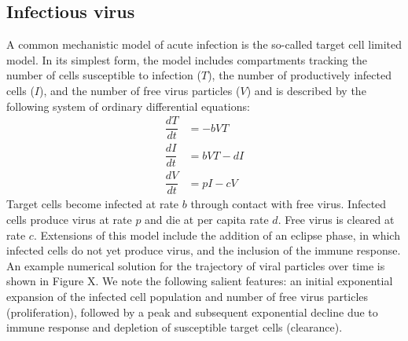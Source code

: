 \documentclass[11pt]{article}
\begin{document}
\subsection{Infectious virus}
A common mechanistic model of   acute infection is the so-called target cell limited model. In its simplest form, the model includes compartments tracking the number of cells susceptible to infection ($T$), the number of productively infected cells ($I$), and the number of free virus particles ($V$) and is described by the following system of ordinary differential equations:
\begin{align*}
    \dfrac{dT}{dt}&= -b V T \\
    \dfrac{dI}{dt}&= b V T - d I \\
    \dfrac{dV}{dt}&= p I - c V
\end{align*}
Target cells become infected at rate $b$ through contact with free virus. Infected cells produce virus at rate $p$ and die at per capita rate $d$. Free virus is cleared at rate $c$. Extensions of this model include the addition of an eclipse phase, in which infected cells do not yet produce virus, and the inclusion of the immune response. An example numerical solution for the trajectory of viral particles over time is shown in Figure X. We note the following salient features: an initial exponential expansion of the infected cell population and number of free virus particles (proliferation), followed by a peak and subsequent exponential decline due to immune response and depletion of susceptible target cells (clearance).
\end{document}
